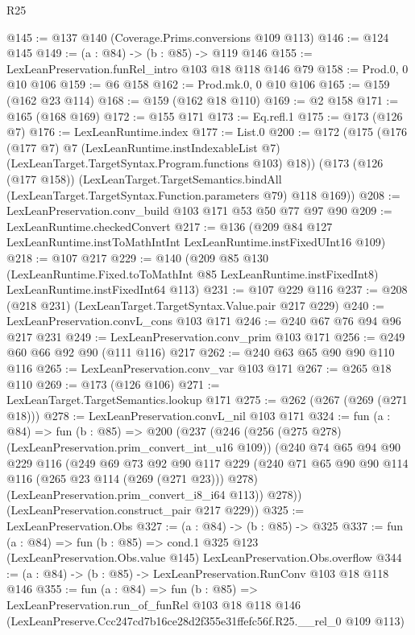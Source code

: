 \begin{lexlean}{R25}
\begin{coremodule}
@145 := @137 @140 (Coverage.Prims.conversions @109 @113)
@146 := @124 @145
@149 := (a : @84) -> (b : @85) -> @119 @146
@155 := LexLeanPreservation.funRel_intro @103 @18 @118 @146 @79
@158 := Prod.{0, 0} @10 @106
@159 := @6 @158
@162 := Prod.mk.{0, 0} @10 @106
@165 := @159 (@162 @23 @114)
@168 := @159 (@162 @18 @110)
@169 := @2 @158
@171 := @165 (@168 @169)
@172 := @155 @171
@173 := Eq.refl.{1}
@175 := @173 (@126 @7)
@176 := LexLeanRuntime.index
@177 := List.{0}
@200 := @172
    (@175
      (@176
        (@177 @7)
        @7
        (LexLeanRuntime.instIndexableList @7)
        (LexLeanTarget.TargetSyntax.Program.functions @103)
        @18))
    (@173
      (@126 (@177 @158))
      (LexLeanTarget.TargetSemantics.bindAll
        (LexLeanTarget.TargetSyntax.Function.parameters @79)
        @118
        @169))
@208 := LexLeanPreservation.conv_build @103 @171 @53 @50 @77 @97 @90
@209 := LexLeanRuntime.checkedConvert
@217 := @136 (@209 @84 @127 LexLeanRuntime.instToMathIntInt LexLeanRuntime.instFixedUInt16 @109)
@218 := @107 @217
@229 := @140
    (@209
      @85
      @130
      (LexLeanRuntime.Fixed.toToMathInt @85 LexLeanRuntime.instFixedInt8)
      LexLeanRuntime.instFixedInt64
      @113)
@231 := @107 @229 @116
@237 := @208 (@218 @231) (LexLeanTarget.TargetSyntax.Value.pair @217 @229)
@240 := LexLeanPreservation.convL_cons @103 @171
@246 := @240 @67 @76 @94 @96 @217 @231
@249 := LexLeanPreservation.conv_prim @103 @171
@256 := @249 @60 @66 @92 @90 (@111 @116) @217
@262 := @240 @63 @65 @90 @90 @110 @116
@265 := LexLeanPreservation.conv_var @103 @171
@267 := @265 @18 @110
@269 := @173 (@126 @106)
@271 := LexLeanTarget.TargetSemantics.lookup @171
@275 := @262 (@267 (@269 (@271 @18)))
@278 := LexLeanPreservation.convL_nil @103 @171
@324 := fun (a : @84) =>
  fun (b : @85) =>
  @200
    (@237
      (@246
        (@256 (@275 @278) (LexLeanPreservation.prim_convert_int_u16 @109))
        (@240
          @74
          @65
          @94
          @90
          @229
          @116
          (@249
            @69
            @73
            @92
            @90
            @117
            @229
            (@240 @71 @65 @90 @90 @114 @116 (@265 @23 @114 (@269 (@271 @23))) @278)
            (LexLeanPreservation.prim_convert_i8_i64 @113))
          @278))
      (LexLeanPreservation.construct_pair @217 @229))
@325 := LexLeanPreservation.Obs
@327 := (a : @84) -> (b : @85) -> @325
@337 := fun (a : @84) =>
  fun (b : @85) =>
  cond.{1} @325 @123 (LexLeanPreservation.Obs.value @145) LexLeanPreservation.Obs.overflow
@344 := (a : @84) -> (b : @85) -> LexLeanPreservation.RunConv @103 @18 @118 @146
@355 := fun (a : @84) =>
  fun (b : @85) =>
  LexLeanPreservation.run_of_funRel
    @103
    @18
    @118
    @146
    (LexLeanPreserve.Ccc247cd7b16ce28d2f355e31ffefc56f.R25.__rel_0 @109 @113)
\end{coremodule}
\end{lexlean}
